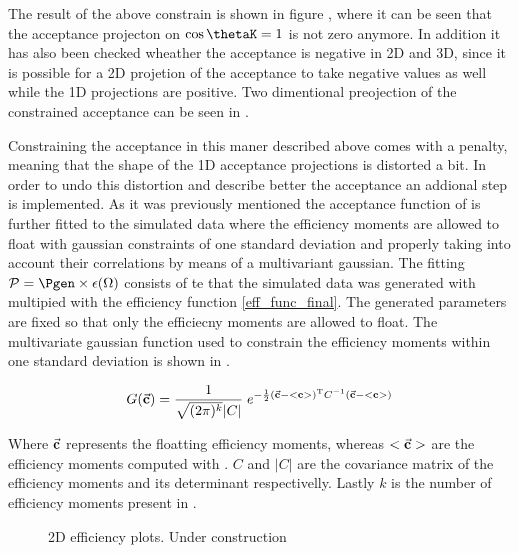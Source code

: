 \noindent The result of the above constrain is shown in figure , where it can be seen that the acceptance projecton on $\cos\thetaK=1$
is not zero anymore. In addition it has also been checked wheather the acceptance is negative in 2D and 3D, since it is possible for a 2D
projetion of the acceptance to take negative values as well while the 1D projections are positive. Two dimentional preojection of the constrained acceptance can be seen in .

Constraining the acceptance in this maner described above comes with a penalty, meaning that the shape of the 1D acceptance
projections is distorted a bit. In order to undo this distortion and describe better the acceptance an addional step is implemented. 
As it was previously mentioned the acceptance function of  is further fitted to the simulated data where the efficiency
moments are allowed to float with gaussian constraints of one standard deviation and properly taking into account their correlations by
means of a multivariant gaussian. The fitting \pdf $\mathcal{P}=\Pgen\times\epsilon(\Omega)$ consists of te \pdf that the simulated data was generated
with multipied with the efficiency function \eqref{eff_func_final}. The generated parameters are fixed so that only the efficiecny moments are allowed to float.     
The multivariate gaussian function used to constrain the efficiency moments within one standard deviation is shown in .

\begin{center}
\begin{equation}
  G(\vec{\bf{c}}) = \frac{1}{\sqrt{(2\pi)^k}|C|} \; e^{-\frac{1}{2}(  \vec{\bf{c}} - <{\bf{c}}>  )^{\text{T}} C^{-1} (\vec{\bf{c}} - <{\bf{c}}> ) }
  \label{mvm_constr}
\end{equation}
\end{center}

\noindent Where $\vec{\bf c}$ represents the floatting efficiency moments, whereas $<\vec{\bf c}>$ are the efficiency moments computed
with . $C$ and $|C|$ are the covariance matrix of the efficiency moments and its determinant respectivelly.
Lastly $k$ is the number of efficiency moments present in . 

\begin{figure}[h]
  \centering
  \begin{subfigure}{0.5\textwidth}
    \caption{}
    \label{eff2D_ckcl}
  \end{subfigure}
\caption{2D efficiency plots. {\color{red} Under construction}}
\end{figure}


